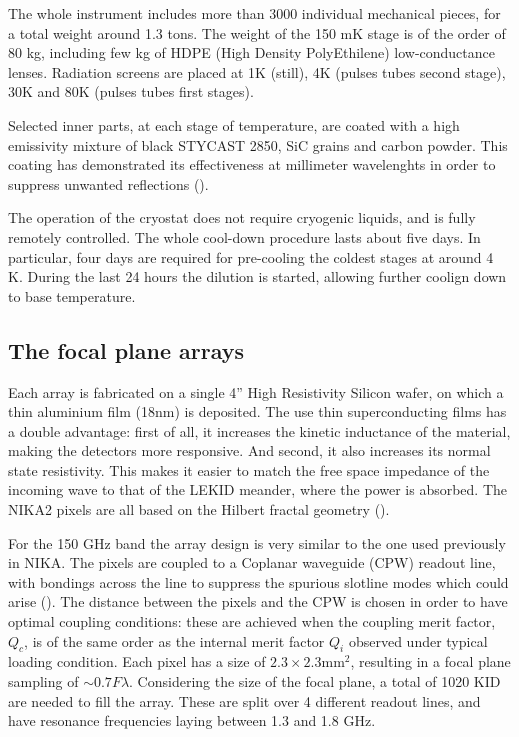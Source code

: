 \documentclass[]{aa} %
\begin{document}
The whole instrument includes more than 3000 individual mechanical pieces, for a total weight around 1.3 tons. The weight of the 150 mK stage is of the order of 80 kg, including few kg of HDPE (High Density PolyEthilene) low-conductance lenses. Radiation screens are placed at 1K (still), 4K (pulses tubes second stage), 30K and 80K (pulses tubes first stages).

Selected inner parts, at each stage of temperature, are coated with a high emissivity mixture of black STYCAST 2850, SiC grains and carbon powder. This coating has demonstrated its effectiveness at millimeter wavelenghts in order to suppress unwanted reflections (\cite{Calvo2010}).

The operation of the cryostat does not require cryogenic liquids, and is fully remotely controlled. The whole cool-down procedure lasts about five days. In particular, four days are required for pre-cooling the coldest stages at around 4 K. During the last 24 hours  the dilution is started, allowing further coolign down to base temperature. 


 \subsection{The focal plane arrays}

Each array is fabricated on a single 4'' High Resistivity Silicon wafer, on which a thin aluminium film (18nm) is deposited. The use thin superconducting films has a double advantage: first of all, it increases the kinetic inductance of the material, making the detectors more responsive. And second, it also increases its normal state resistivity. This makes it easier to match the free space impedance of the incoming wave to that of the LEKID meander, where the power is absorbed. The NIKA2 pixels are all based on the Hilbert fractal geometry (\cite{Roesch2012}). 

For the 150 GHz band the array design is very similar to the one used previously in NIKA. The pixels are coupled to a Coplanar waveguide (CPW) readout line, with bondings across the line to suppress the spurious slotline modes which could arise (\cite{Goupy2016}). The distance between the pixels and the CPW is chosen in order to have optimal coupling conditions: these are achieved when the coupling merit factor, $Q_c$, is of the same order as the internal merit factor $Q_i$ observed under typical loading condition. Each pixel has a size of $2.3\times2.3\textrm{mm}^2$, resulting in a focal plane sampling of $\sim 0.7 F\lambda$. Considering the size of the focal plane, a total of 1020 KID are needed to fill the array. These are split over 4 different readout lines, and have resonance frequencies laying between 1.3 and 1.8 GHz.
\end{document}
